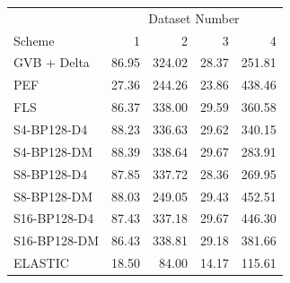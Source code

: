 \begin{tabular}{lrrrr}
\toprule
 & \multicolumn{4}{c}{Dataset Number} \\
Scheme & 1 & 2 & 3 & 4 \\
\midrule
GVB + Delta & 86.95 & 324.02 & 28.37 & 251.81 \\
PEF & 27.36 & 244.26 & 23.86 & 438.46 \\
FLS & 86.37 & 338.00 & 29.59 & 360.58 \\
S4-BP128-D4 & 88.23 & 336.63 & 29.62 & 340.15 \\
S4-BP128-DM & 88.39 & 338.64 & 29.67 & 283.91 \\
S8-BP128-D4 & 87.85 & 337.72 & 28.36 & 269.95 \\
S8-BP128-DM & 88.03 & 249.05 & 29.43 & 452.51 \\
S16-BP128-D4 & 87.43 & 337.18 & 29.67 & 446.30 \\
S16-BP128-DM & 86.43 & 338.81 & 29.18 & 381.66 \\
ELASTIC & 18.50 & 84.00 & 14.17 & 115.61 \\
\bottomrule
\end{tabular}
